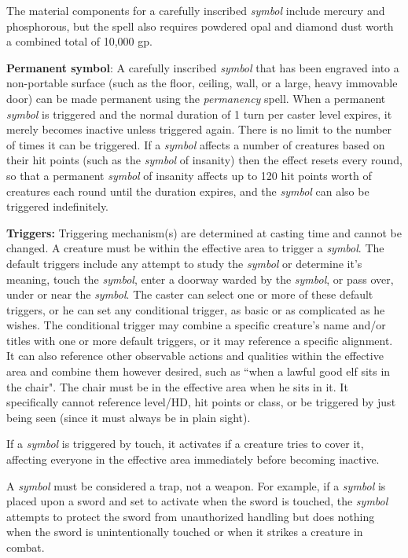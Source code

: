 \begin{multicols}{2}
The material components for a carefully inscribed \textit{symbol} include mercury and phosphorous, but the spell also requires powdered opal and diamond dust worth a combined total of 10,000 gp.

\textbf{Permanent symbol}: A carefully inscribed \textit{symbol} that has been engraved into a non-portable surface (such as the floor, ceiling, wall, or a large, heavy immovable door) can be made permanent using the \textit{permanency} spell.  When a permanent \textit{symbol} is triggered and the normal duration of 1 turn per caster level expires, it merely becomes inactive unless triggered again.  There is no limit to the number of times it can be triggered.  If a \textit{symbol} affects a number of creatures based on their hit points (such as the \textit{symbol} of insanity) then the effect resets every round, so that a permanent \textit{symbol} of insanity affects up to 120 hit points worth of creatures each round until the duration expires, and the \textit{symbol} can also be triggered indefinitely.

\textbf{Triggers:} Triggering mechanism(s) are determined at casting time and cannot be changed.  A creature must be within the effective area to trigger a \textit{symbol}.  The default triggers include any attempt to study the \textit{symbol} or determine it's meaning, touch the \textit{symbol}, enter a doorway warded by the \textit{symbol}, or pass over, under or near the \textit{symbol}.  The caster can select one or more of these default triggers, or he can set any conditional trigger, as basic or as complicated as he wishes.  The conditional trigger may combine a specific creature's name and/or titles with one or more default triggers, or it may reference a specific alignment.  It can also reference other observable actions and qualities within the effective area and combine them however desired, such as ``when a lawful good elf sits in the chair".  The chair must be in the effective area when he sits in it.  It specifically cannot reference level/HD, hit points or class, or be triggered by just being seen (since it must always be in plain sight).

If a \textit{symbol} is triggered by touch, it activates if a creature tries to cover it, affecting everyone in the effective area immediately before becoming inactive.  

A \textit{symbol} must be considered a trap, not a weapon. For example, if a \textit{symbol} is placed upon a sword and set to activate when the sword is touched, the \textit{symbol} attempts to protect the sword from unauthorized handling but does nothing when the sword is unintentionally touched or when it strikes a creature in combat.


\end{multicols}
